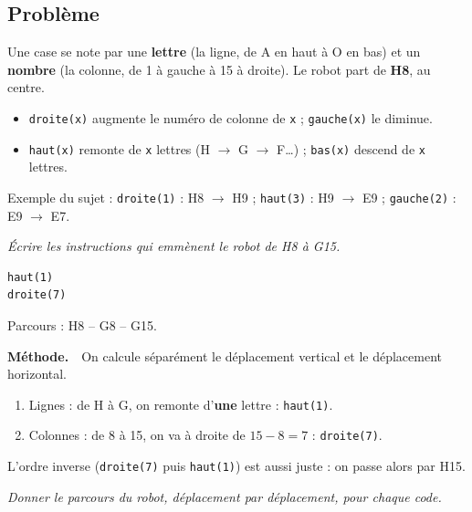 \documentclass[addpoints, 11pt]{exam}
\newcommand{\enonce}[1]{\textit{#1}\par\smallskip}
\newcommand{\methode}{\par\smallskip\noindent\textbf{Méthode.}\ }
\newcommand{\code}[1]{\texttt{#1}}
\DeclareRobustCommand{\_}{\textunderscore\allowbreak}
\begin{document}
\begin{questions}
\section{Problème}

\begin{astuce}
Une case se note par une \textbf{lettre} (la ligne, de A en haut à O en bas) et un \textbf{nombre} (la colonne, de 1 à gauche à 15 à droite). Le robot part de \textbf{H8}, au centre.
\begin{itemize}
  \item \code{droite(x)} augmente le numéro de colonne de \code{x} ; \code{gauche(x)} le diminue.
  \item \code{haut(x)} remonte de \code{x} lettres (H $\to$ G $\to$ F\dots) ; \code{bas(x)} descend de \code{x} lettres.
\end{itemize}
Exemple du sujet : \code{droite(1)} : H8 $\to$ H9 ; \code{haut(3)} : H9 $\to$ E9 ; \code{gauche(2)} : E9 $\to$ E7.
\end{astuce}

\question[1] \enonce{Écrire les instructions qui emmènent le robot de H8 à G15.}
\begin{reponse}
\begin{lstlisting}
haut(1)
droite(7)
\end{lstlisting}
Parcours : H8 -- G8 -- G15.
\end{reponse}
\methode\ On calcule séparément le déplacement vertical et le déplacement horizontal.
\begin{enumerate}
  \item Lignes : de H à G, on remonte d'\textbf{une} lettre : \code{haut(1)}.
  \item Colonnes : de 8 à 15, on va à droite de $15 - 8 = 7$ : \code{droite(7)}.
\end{enumerate}
L'ordre inverse (\code{droite(7)} puis \code{haut(1)}) est aussi juste : on passe alors par H15.

\question[4] \enonce{Donner le parcours du robot, déplacement par déplacement, pour chaque code.}
\end{questions}
\end{document}
